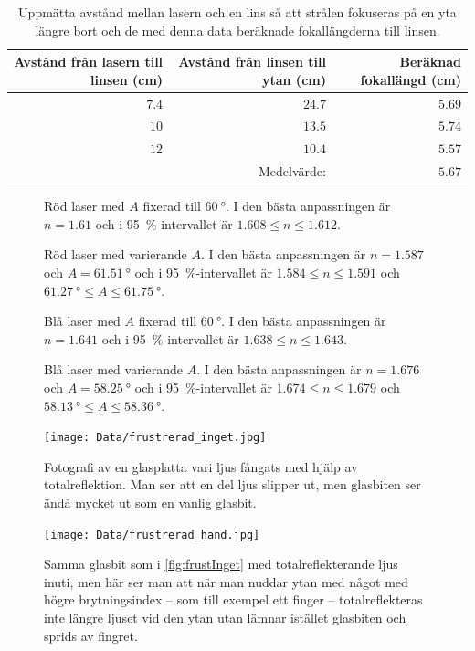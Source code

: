 \documentclass[a4paper]{article}
\begin{document}
\begin{table}[h]
	\centering
	\caption{Uppmätta avstånd mellan lasern och en lins så att strålen fokuseras på en yta längre bort och de med denna data beräknade fokallängderna till linsen.}
	\label{tab:foc}
	\begin{tabular}{|rrr|}\hline %
		Avstånd från lasern till linsen (\si{\centi\meter}) & Avstånd från linsen till ytan (\si{\centi\meter}) & Beräknad fokallängd (\si{\centi\meter}) \\\hline
		$7.4$ & $24.7$ & $5.69$ \\
		$10$ & $13.5$ & $5.74$ \\
		$12$ & $10.4$ & $5.57$ \\\hline
		& Medelvärde: & $5.67$ \\\hline
	\end{tabular}
\end{table}
\begin{figure}[h]
	\centering
	
	\caption{Röd laser med $A$ fixerad till $\SI{60}{\degree}$. I den bästa anpassningen är $n=1.61$ och i \SI{95}{\percent}-intervallet är $1.608\le n \le1.612$.}
	\label{fig:red60}
\end{figure}
\begin{figure}[h]
	\centering
	
	\caption{Röd laser med varierande $A$. I den bästa anpassningen är $n=1.587$ och $A=\SI{61.51}{\degree}$ och i \SI{95}{\percent}-intervallet är $1.584\le n \le1.591$ och $\SI{61.27}{\degree}\le A \le\SI{61.75}{\degree}$.}
	\label{fig:red}
\end{figure}
\begin{figure}[h]
	\centering
	
	\caption{Blå laser med $A$ fixerad till $\SI{60}{\degree}$. I den bästa anpassningen är $n=1.641$ och i \SI{95}{\percent}-intervallet är $1.638\le n \le1.643$.}
	\label{fig:blue60}
\end{figure}
\begin{figure}[h]
	\centering
	
	\caption{Blå laser med varierande $A$. I den bästa anpassningen är $n=1.676$ och $A=\SI{58.25}{\degree}$ och i \SI{95}{\percent}-intervallet är $1.674\le n \le1.679$ och $\SI{58.13}{\degree}\le A \le\SI{58.36}{\degree}$.}
	\label{fig:blue}
\end{figure}

\begin{figure}[h]
	\centering
	\texttt{[image: Data/frustrerad\_inget.jpg]}
	\caption{Fotografi av en glasplatta vari ljus fångats med hjälp av totalreflektion. Man ser att en del ljus slipper ut, men glasbiten ser ändå mycket ut som en vanlig glasbit.}
	\label{fig:frustInget}
\end{figure}
\begin{figure}[h]
	\centering
	\texttt{[image: Data/frustrerad\_hand.jpg]}
	\caption{Samma glasbit som i \autoref{fig:frustInget} med totalreflekterande ljus inuti, men här ser man att när man nuddar ytan med något med högre brytningsindex -- som till exempel ett finger -- totalreflekteras inte längre ljuset vid den ytan utan lämnar istället glasbiten och sprids av fingret.}
	\label{fig:frustHand}
\end{figure}
\end{document}
